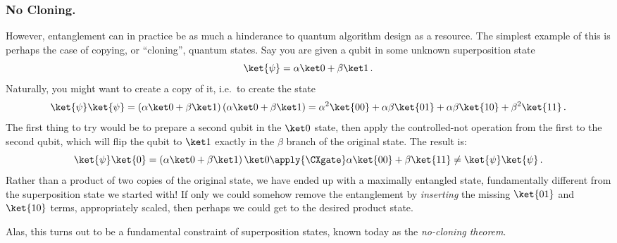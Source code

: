     \subsubsection{No Cloning.}
      However, entanglement can in practice be as much a hinderance to quantum
        algorithm design as a resource. The
        simplest example of this is perhaps the case of copying, or ``cloning'',
        quantum states. Say you are given a qubit in some unknown superposition state
      \[
        \ket{\psi} = \alpha\ket 0 + \beta\ket 1\, .
      \]
      Naturally, you might want to create a copy of it, i.e.\ to create the
      state
      \[
        \ket{\psi}\ket{\psi} = 
        \left(
          \alpha\ket 0 + \beta\ket 1
        \right)
        \left(
          \alpha\ket 0 + \beta\ket 1
        \right)
        = \alpha^2 \ket{00} + \alpha\beta \ket{01} + \alpha\beta \ket{10} +
        \beta^2 \ket{11}\, .
      \]
      The first thing to try would be to prepare a second qubit in the $\ket 0$
        state, then apply the controlled-not operation from the first to the
        second qubit, which will flip the qubit to $\ket 1$ exactly in the $\beta$
        branch of the original state. The result is: 
      \[
        \ket{\psi}\ket{0} = 
        \left(
          \alpha\ket 0 + \beta\ket 1
        \right)
        \ket 0 \apply{\CXgate} 
        \alpha\ket{00} + \beta\ket{11}
        \neq 
        \ket{\psi}\ket{\psi}\, . 
      \]
      Rather than a product of two copies of the original state, we have ended
      up with a maximally entangled state, fundamentally different from the
      superposition state we started with! If only we could somehow remove the
      entanglement by \emph{inserting} the missing
      $\ket{01}$ and $\ket{10}$ terms, appropriately scaled, then perhaps we
      could get to the desired product state. 

    Alas, this turns out to be a fundamental constraint
      of superposition states, known today as the \emph{no-cloning theorem}.


